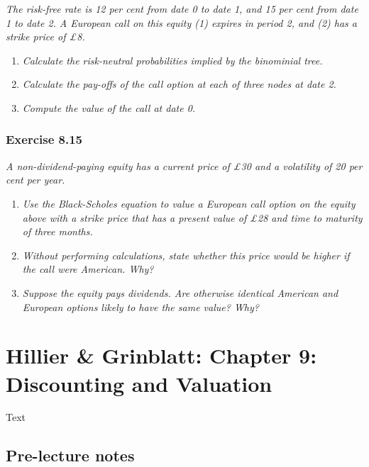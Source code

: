 \documentclass[]{book}
\theoremstyle{definition}
\theoremstyle{definition}
\theoremstyle{remark}
\begin{document}
\emph{The risk-free rate is 12 per cent from date 0 to date 1, and 15
per cent from date 1 to date 2. A European call on this equity (1)
expires in period 2, and (2) has a strike price of £8.}
\citep[p.272]{book}

\begin{enumerate}
\def\labelenumi{\alph{enumi}.}
\item
  \emph{Calculate the risk-neutral probabilities implied by the
  binominial tree.} \citep[p.272]{book}
\item
  \emph{Calculate the pay-offs of the call option at each of three nodes
  at date 2.} \citep[p.272]{book}
\item
  \emph{Compute the value of the call at date 0.} \citep[p.272]{book}
\end{enumerate}

\subsection{Exercise 8.15}\label{exercise-8.15}

\emph{A non-dividend-paying equity has a current price of £30 and a
volatility of 20 per cent per year.} \citep[p.272]{book}

\begin{enumerate}
\def\labelenumi{\alph{enumi}.}
\item
  \emph{Use the Black-Scholes equation to value a European call option
  on the equity above with a strike price that has a present value of
  £28 and time to maturity of three months.} \citep[p.272]{book}
\item
  \emph{Without performing calculations, state whether this price would
  be higher if the call were American. Why?} \citep[p.272]{book}
\item
  \emph{Suppose the equity pays dividends. Are otherwise identical
  American and European options likely to have the same value? Why?}
  \citep[p.272]{book}
\end{enumerate}

\chapter{Hillier \& Grinblatt: Chapter 9: Discounting and
Valuation}\label{hillier-grinblatt-chapter-9-discounting-and-valuation}

Text

\section{Pre-lecture notes}\label{pre-lecture-notes-8}
\end{document}
